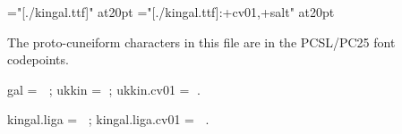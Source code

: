 \font\kingal="[./kingal.ttf]" at20pt
\font\kingali="[./kingal.ttf]:+cv01,+salt" at20pt

\rm The proto-cuneiform characters in this file are in the PCSL/PC25 font codepoints.

\rm gal = \kingal 𒟛 \rm; ukkin = \kingal 𒪦\rm; ukkin.cv01 = \kingali 𒪦\rm.

\rm kingal.liga = \kingal 𒟛‍𒪦\rm; kingal.liga.cv01 = \kingali 𒟛‍𒪦\rm.

\bye
